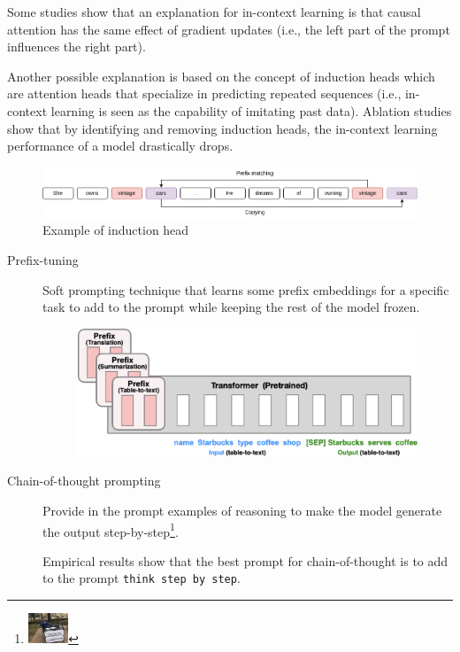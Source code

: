 \begin{remark}
    Some studies show that an explanation for in-context learning is that causal attention has the same effect of gradient updates (i.e., the left part of the prompt influences the right part).

    Another possible explanation is based on the concept of induction heads which are attention heads that specialize in predicting repeated sequences (i.e., in-context learning is seen as the capability of imitating past data). Ablation studies show that by identifying and removing induction heads, the in-context learning performance of a model drastically drops.

    \begin{figure}[H]
        \centering
        \includegraphics[width=0.9\linewidth]{./img/induction_head.png}
        \caption{Example of induction head}
    \end{figure}
\end{remark}

\begin{description}
    \item[Prefix-tuning] 
        Soft prompting technique that learns some prefix embeddings for a specific task to add to the prompt while keeping the rest of the model frozen.

        \begin{figure}[H]
            \centering
            \includegraphics[width=0.65\linewidth]{./img/prefix_tuning.png}
        \end{figure}

    \item[Chain-of-thought prompting] 
        Provide in the prompt examples of reasoning to make the model generate the output step-by-step\footnote{\includegraphics[width=1.2cm]{img/meme.jpg}}.

        \begin{remark}
            Empirical results show that the best prompt for chain-of-thought is to add to the prompt \texttt{think step by step}.
        \end{remark}
\end{description}